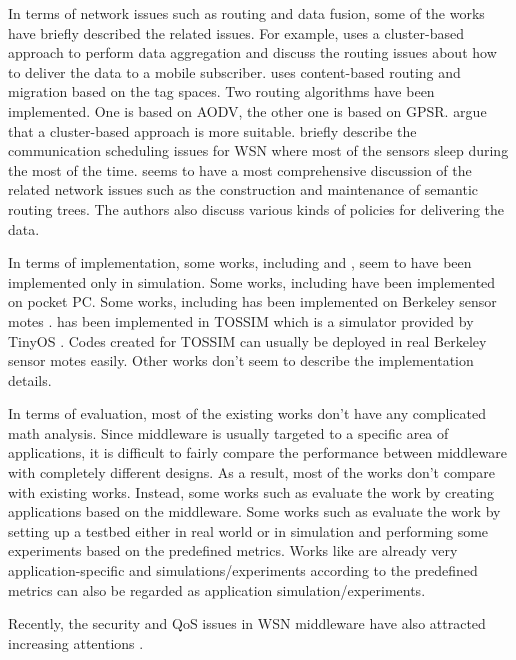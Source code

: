 In terms of network issues such as routing and data fusion, some of the works have briefly described the related issues. For example, \cite{sina} uses a cluster-based approach to perform data aggregation and discuss the routing issues about how to deliver the data to a mobile subscriber. \cite{smartmessage} uses content-based routing and migration based on the tag spaces. Two routing algorithms have been implemented. One is based on AODV, the other one is based on GPSR. \cite{clustermiddleware} argue that a cluster-based approach is more suitable. \cite{tinylime} briefly describe the communication scheduling issues for WSN where most of the sensors sleep during the most of the time. \cite{tinydb} seems to have a most comprehensive discussion of the related network issues such as the construction and maintenance of semantic routing trees. The authors also discuss various kinds of policies for delivering the data.

In terms of implementation, some works, including \cite{sina} and \cite{dsware}, seem to have been implemented only in simulation. Some works, including \cite{impala, sensorware, smartmessage} have been implemented on pocket PC. Some works, including \cite{mate, tinylime, tinydb, envirotrack, agilla} has been implemented on Berkeley sensor motes \cite{crossbow}. \cite{tinycubus} has been implemented in TOSSIM \cite{tossim} which is a simulator provided by TinyOS \cite{nesc}. Codes created for TOSSIM can usually be deployed in real Berkeley sensor motes easily. Other works don't seem to describe the implementation details.

In terms of evaluation, most of the existing works don't have any complicated math analysis. Since middleware is usually targeted to a specific area of applications, it is difficult to fairly compare the performance between middleware with completely different designs. As a result, most of the works don't compare with existing works. Instead, some works such as \cite{sina, mate, sensorware, smartmessage, agilla} evaluate the work by creating applications based on the middleware. Some works such as \cite{impala, dsware, clustermiddleware, tinycubus, tinylime}  evaluate the work by setting up a testbed either in real world or in simulation and performing some experiments based on the predefined metrics. Works like \cite{envirotrack, tinydb} are already very application-specific and simulations/experiments according to the predefined metrics can also be regarded as application simulation/experiments.

Recently, the security and QoS issues in WSN middleware have also attracted increasing attentions \cite{milan}.